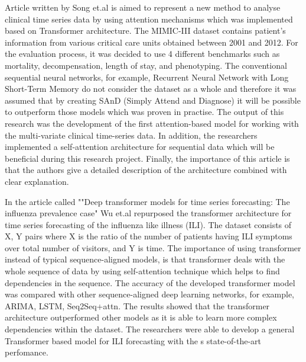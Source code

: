 \documentclass[]{final_report}
\begin{document}
Article written by Song et.al \cite{song2018attend} is aimed to represent a new method to analyse clinical time series data by using attention mechanisms which was implemented based on Transformer architecture. The MIMIC-III dataset contains patient’s information from various critical care units obtained between 2001 and 2012. For the evaluation process, it was decided to use 4 different benchmarks such as mortality, decompensation, length of stay, and phenotyping. The conventional sequential neural networks, for example, Recurrent Neural Network with Long Short-Term Memory do not consider the dataset as a whole and therefore it was assumed that by creating SAnD (Simply Attend and Diagnose) it will be possible to outperform those models which was proven in practise. The output of this research was the development of the first attention-based model for working with the multi-variate clinical time-series data. In addition, the researchers implemented a self-attention architecture for sequential data which will be beneficial during this research project. Finally, the importance of this article is that the authors give a detailed description of the architecture combined with clear explanation. 

In the article called ""Deep transformer models for time series forecasting: The influenza prevalence case" Wu et.al \cite{wu2020deep} repurposed the transformer architecture for time series forecasting of the influenza like illness (ILI). The dataset consists of X, Y pairs where X is the ratio of the number of patients having ILI symptoms over total number of visitors, and Y is time. The importance of using transformer instead of typical sequence-aligned models, is that transformer deals with the whole sequence of data by using self-attention technique which helps to find dependencies in the sequence. The accuracy of the developed transformer model was compared with other sequence-aligned deep learning networks, for example, ARIMA, LSTM, Seq2Seq+attn. The results showed that the transformer architecture outperformed other models as it is able to learn more complex dependencies within the dataset. The researchers were able to develop a general Transformer based model for ILI forecasting with the s state-of-the-art perfomance. 
\end{document}
